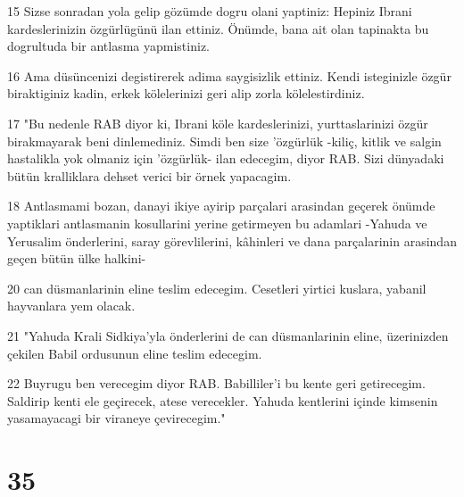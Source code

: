 \par 15 Sizse sonradan yola gelip gözümde dogru olani yaptiniz: Hepiniz Ibrani kardeslerinizin özgürlügünü ilan ettiniz. Önümde, bana ait olan tapinakta bu dogrultuda bir antlasma yapmistiniz.
\par 16 Ama düsüncenizi degistirerek adima saygisizlik ettiniz. Kendi isteginizle özgür biraktiginiz kadin, erkek kölelerinizi geri alip zorla kölelestirdiniz.
\par 17 "Bu nedenle RAB diyor ki, Ibrani köle kardeslerinizi, yurttaslarinizi özgür birakmayarak beni dinlemediniz. Simdi ben size 'özgürlük -kiliç, kitlik ve salgin hastalikla yok olmaniz için 'özgürlük- ilan edecegim, diyor RAB. Sizi dünyadaki bütün kralliklara dehset verici bir örnek yapacagim.
\par 18 Antlasmami bozan, danayi ikiye ayirip parçalari arasindan geçerek önümde yaptiklari antlasmanin kosullarini yerine getirmeyen bu adamlari -Yahuda ve Yerusalim önderlerini, saray görevlilerini, kâhinleri ve dana parçalarinin arasindan geçen bütün ülke halkini-
\par 20 can düsmanlarinin eline teslim edecegim. Cesetleri yirtici kuslara, yabanil hayvanlara yem olacak.
\par 21 "Yahuda Krali Sidkiya'yla önderlerini de can düsmanlarinin eline, üzerinizden çekilen Babil ordusunun eline teslim edecegim.
\par 22 Buyrugu ben verecegim diyor RAB. Babilliler'i bu kente geri getirecegim. Saldirip kenti ele geçirecek, atese verecekler. Yahuda kentlerini içinde kimsenin yasamayacagi bir viraneye çevirecegim."

\chapter{35}

